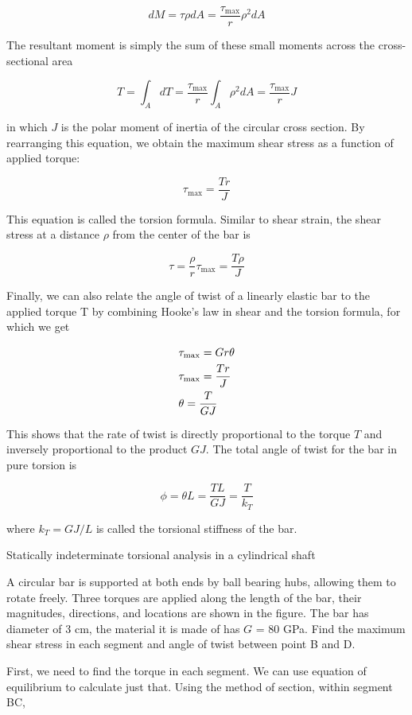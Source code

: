 \documentclass[a4paper,openany,12pt]{book}
\begin{document}
$$dM = \tau \rho dA = \frac{\tau _{\max }}{r}\rho ^2dA$$

The resultant moment is simply the sum of these small moments across the
cross-sectional area


$$T = \int_A {dT}  = \frac{\tau _{\max }}{r}\int_A \rho ^2dA  = \frac{\tau _{\max }}{r}J$$

in which \(J\) is the polar moment of inertia of the circular cross
section. By rearranging this equation, we obtain the maximum shear
stress as a function of applied torque:

$$\tau _{\max } = \frac{Tr}{J}$$

This equation is called the torsion formula. Similar to shear strain,
the shear stress at a distance \(\rho\) from the center of the bar is

$$\tau  = \frac{\rho }{r}\tau _{\max } = \frac{T\rho }{J}$$

Finally, we can also relate the angle of twist of a linearly elastic bar
to the applied torque T by combining Hooke's law in shear and the
torsion formula, for which we get

$$\begin{gathered}
    \tau _{\max } = Gr\theta \\
    \tau _{\max } = \frac{Tr}{J} \hfill \\
    \theta  = \frac{T}{GJ} \hfill \\ 
  \end{gathered}$$

This shows that the rate of twist is directly proportional to the torque
\(T\) and inversely proportional to the product \(GJ\). The total angle of
twist for the bar in pure torsion is

$$\phi  = \theta L = \frac{TL}{GJ} = \frac{T}{k_T}$$

where \(k_T = GJ/L\) is called the torsional stiffness of the bar.

Statically indeterminate torsional analysis in a cylindrical shaft

A circular bar is supported at both ends by ball bearing hubs, allowing
them to rotate freely. Three torques are applied along the length of the
bar, their magnitudes, directions, and locations are shown in the
figure. The bar has diameter of 3 cm, the material it is made of has \(G\)
= 80 GPa. Find the maximum shear stress in each segment and angle of
twist between point B and D.


First, we need to find the torque in each segment. We can use equation
of equilibrium to calculate just that. Using the method of section,
within segment BC,
\end{document}
